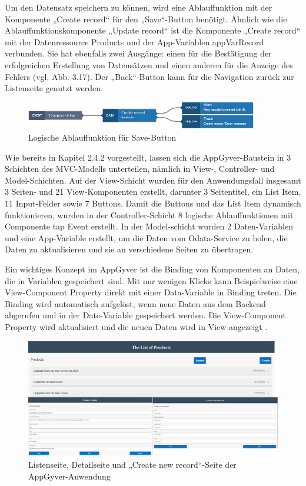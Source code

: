 Um den Datensatz speichern zu können, wird eine Ablauffunktion mit der Komponente „Create record“ für den „Save“-Button benötigt. Ähnlich wie die Ablauffunktionskomponente „Update record“ ist die Komponente „Create record“ mit der Datenressource Products und der App-Variablen appVarRecord verbunden. Sie hat ebenfalls zwei Ausgänge: einen für die Bestätigung der erfolgreichen Erstellung von Datensätzen und einen anderen für die Anzeige des Fehlers (vgl. Abb. 3.17). Der „Back“-Button kann für die Navigation zurück zur Listenseite genutzt werden.

\begin{figure}[htbp]
 \centering
 \includegraphics[width=0.9\textwidth]{Bilder/appgyver/3_17_logik_Save_Button.jpg}
 \caption{Logische Ablauffunktion für Save-Button}
\end{figure}

Wie bereits in Kapitel 2.4.2 vorgestellt, lassen sich die AppGyver-Baustein in 3 Schichten des MVC-Modells unterteilen, nämlich in View-, Controller- und Model-Schichten. Auf der View-Schicht wurden für den Anwendungsfall insgesamt 3 Seiten- und 21 View-Komponenten erstellt, darunter 3 Seitentitel, ein List Item, 11 Input-Felder sowie 7 Buttons. Damit die Buttons und das List Item dynamisch funktionieren, wurden in der Controller-Schicht 8 logische Ablauffunktionen mit Componente tap Event erstellt. In der Model-schicht wurden 2 Daten-Variablen und eine App-Variable erstellt, um die Daten vom Odata-Service zu holen, die Daten zu aktualisieren und sie an verschiedene Seiten zu übertragen.

Ein wichtiges Konzept im AppGyver ist die Binding von Komponenten an Daten, die in Variablen gespeichert sind. Mit nur wenigen Klicks kann Beispielweise eine View-Component Property direkt mit einer Data-Variable in Binding treten. Die Binding wird automatisch aufgelöst, wenn neue Daten aus dem Backend abgerufen und in der Date-Variable gespeichert werden. Die View-Component Property wird aktualisiert und die neuen Daten wird in View angezeigt \cite{appg:bd}.

\begin{figure}[htbp]
 \centering
 \includegraphics[width=1.0\textwidth]{Bilder/appgyver/3_18_appgyver_list.jpg}
 \caption{Listenseite, Detailseite und „Create new record“-Seite der AppGyver-Anwendung}
\end{figure}

